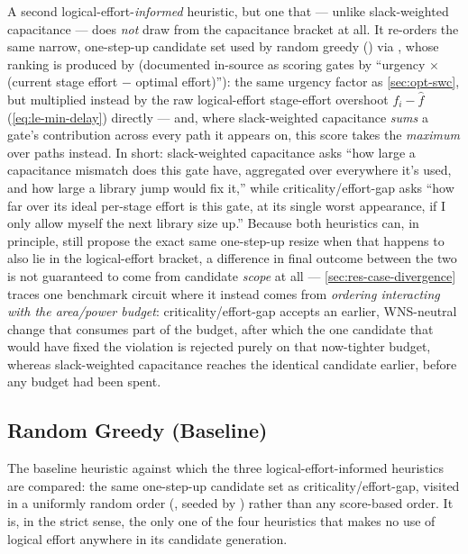 A second logical-effort-\emph{informed} heuristic, but one that --- unlike
slack-weighted capacitance --- does \emph{not} draw from the capacitance
bracket at all. It re-orders the same narrow, one-step-up candidate set
used by random greedy () via
,
whose ranking is produced by  (documented in-source as scoring gates by
``urgency \(\times\) (current stage effort $-$ optimal effort)''): the same
urgency factor as \cref{sec:opt-swc}, but multiplied instead by the raw
logical-effort stage-effort overshoot $f_i - \hat f$
(\cref{eq:le-min-delay}) directly --- and, where slack-weighted capacitance
\emph{sums} a gate's contribution across every path it appears on, this
score takes the \emph{maximum} over paths instead. In short: slack-weighted
capacitance asks ``how large a capacitance mismatch does this gate have,
aggregated over everywhere it's used, and how large a library jump would
fix it,'' while criticality/effort-gap asks ``how far over its ideal
per-stage effort is this gate, at its single worst appearance, if I only
allow myself the next library size up.'' Because both heuristics can, in
principle, still propose the exact same one-step-up resize when that
happens to also lie in the logical-effort bracket, a difference in final
outcome between the two is not guaranteed to come from candidate
\emph{scope} at all --- \cref{sec:res-case-divergence} traces one benchmark
circuit where it instead comes from \emph{ordering interacting with the
area/power budget}: criticality/effort-gap accepts an earlier, WNS-neutral
change that consumes part of the budget, after which the one candidate
that would have fixed the violation is rejected purely on that
now-tighter budget, whereas slack-weighted capacitance reaches the
identical candidate earlier, before any budget had been spent.

\subsection{Random Greedy (Baseline)}
\label{sec:opt-random-greedy}

The baseline heuristic against which the three logical-effort-informed
heuristics are compared: the same one-step-up candidate set as
criticality/effort-gap, visited in a uniformly random order
(, seeded by
) rather than any
score-based order. It is, in the strict sense, the only one of the four
heuristics that makes no use of logical effort anywhere in its candidate
generation.

